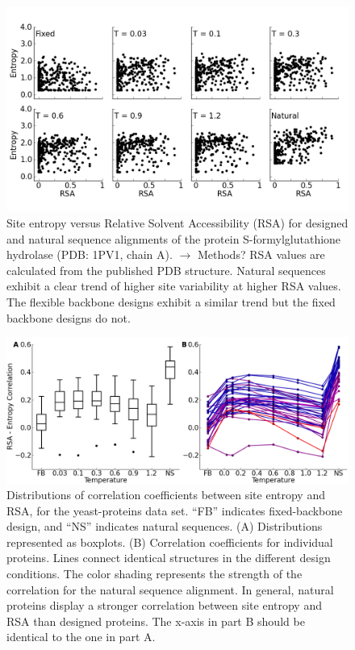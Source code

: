 \documentclass[12pt]{article}
\begin{document}
\begin{figure}[H]
\centerline{\includegraphics[width = 6.5in]{figures/RSA_vs_Entropy_1PV1_Combination_Plot.png}}
\caption{Site entropy versus Relative Solvent Accessibility (RSA) for designed and natural sequence alignments of the protein S-formylglutathione hydrolase (PDB: 1PV1, chain A). {\color{blue}$\longrightarrow$ Methods? RSA values are calculated from the published PDB structure.} Natural sequences exhibit a clear trend of higher site variability at higher RSA values. The flexible backbone designs exhibit a similar trend but the fixed backbone designs do not.}
\label{Entropy_vs_RSA_example}
\end{figure}


\begin{figure}[H]
\centerline{\includegraphics[width = 6in]{figures/Cor_Mean_Entropy_RSA_Combination_Plot.png}}
\caption{Distributions of correlation coefficients between site entropy and RSA, for the yeast-proteins data set. ``FB'' indicates fixed-backbone design, and ``NS'' indicates natural sequences. (A) Distributions represented as boxplots. (B) Correlation coefficients for individual proteins. Lines connect identical structures in the different design conditions. The color shading represents the strength of the correlation for the natural sequence alignment. In general, natural proteins display a stronger correlation between site entropy and RSA than designed proteins. {\color{red}The x-axis in part B should be identical to the one in part A.}}
\label{Correlation_figure}
\end{figure}
\end{document}
